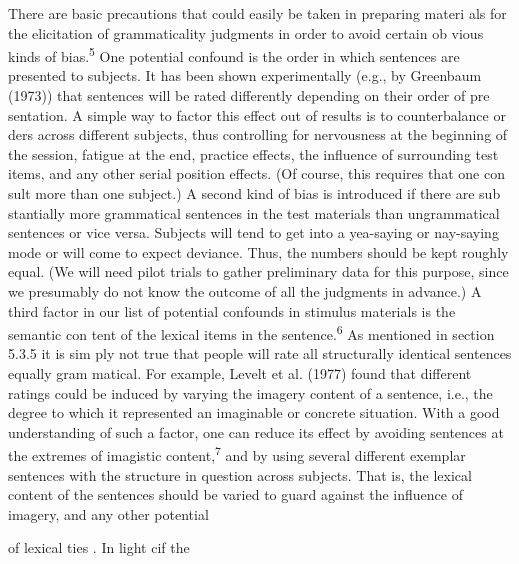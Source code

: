 \begin{styleStandard}
There are basic precautions that could easily be taken in preparing materi\- als for the elicitation of grammaticality judgments in order to avoid certain ob\- vious kinds of bias.\textsuperscript{5}\textsuperscript{ }One potential confound is the order in which sentences are presented to subjects. It has been shown experimentally (e.g., by Greenbaum (1973)) that sentences will be rated differently depending on their order of pre\- sentation. A simple way to factor this effect out of results is to counterbalance or\- ders across different subjects, thus controlling for nervousness at the beginning of the session, fatigue at the end, practice effects, the influence of surrounding test items, and any other serial position effects. (Of course, this requires that one con\- sult more than one subject.) A second kind of bias is introduced if there are sub\- stantially more grammatical sentences in the test materials than ungrammatical sentences or vice versa. Subjects will tend to get into a yea-saying or nay-saying mode or will come to expect deviance. Thus, the numbers should be kept roughly equal. (We will need pilot trials to gather preliminary data for this purpose, since we presumably do not know the outcome of all the judgments in advance.) A third factor in our list of potential confounds in stimulus materials is the semantic con\- tent of the lexical items in the sentence.\textsuperscript{6}\textsuperscript{ }As mentioned in section 5.3.5 it is sim\- ply not true that people will rate all structurally identical sentences equally gram\- matical. For example, Levelt et al. (1977) found that different ratings could be induced by varying the imagery content of a sentence, i.e., the degree to which it represented an imaginable or concrete situation. With a good understanding of such a factor, one can reduce its effect by avoiding sentences at the extremes of imagistic content,\textsuperscript{7}\textsuperscript{ }and by using several different exemplar sentences with the structure in question across subjects. That is, the lexical content of the sentences should be varied to guard against the influence of imagery, and any other potential
\end{styleStandard}


\begin{styleStandard}
of lexical ties . In light cif the
\end{styleStandard}


